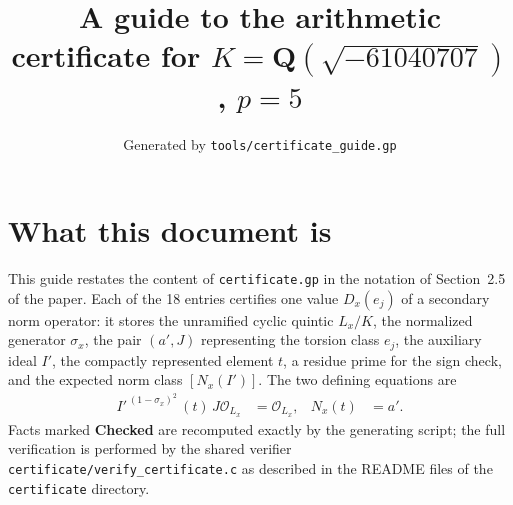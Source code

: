 \documentclass[11pt]{article}
\title{A guide to the arithmetic certificate for $K=\mathbf Q(\sqrt{-61040707})$, $p=5$}
\author{}
\date{Generated by \texttt{tools/certificate\_guide.gp}}
\begin{document}
\maketitle
\section*{What this document is}
This guide restates the content of \texttt{certificate.gp} in the
notation of Section~2.5 of the paper.  Each of the 18 entries
certifies one value $D_x(e_j)$ of a secondary norm operator: it
stores the unramified cyclic quintic $L_x/K$, the normalized
generator $\sigma_x$, the pair $(a',J)$ representing the torsion
class $e_j$, the auxiliary ideal $I'$, the compactly represented
element $t$, a residue prime for the sign check, and the expected
norm class $[N_x(I')]$.  The two defining equations are
\begin{align*}
I'^{\,(1-\sigma_x)^2}\,(t)\,J\mathcal O_{L_x}&=\mathcal O_{L_x},&
N_x(t)&=a'.
\end{align*}
Facts marked \textbf{Checked} are recomputed exactly by the
generating script; the full verification is performed by the
shared verifier \texttt{certificate/verify\_certificate.c} as
described in the README files of the \texttt{certificate}
directory.
\end{document}
